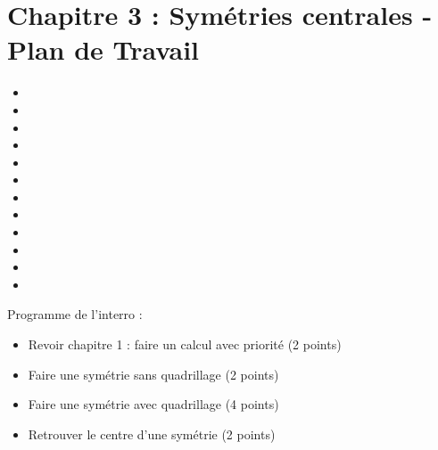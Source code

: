 \section*{Chapitre 3 : Symétries centrales - Plan de Travail}

{\begin{multicols}{4}
\begin{itemize}
    \itemindent=-25pt
        \item {}
        \item {}
        \item {}
        \item {}
        \item {}
        \item {}
        \item {}
        \item {}
        \item {}
        \item {}
        \item {}
        \item {}
    \end{itemize}
\end{multicols}}

\begin{plandetravailDS}
    Programme de l'interro :
    \begin{itemize}
        \item Revoir chapitre 1 : faire un calcul avec priorité (2 points) 
        \item Faire une symétrie sans quadrillage (2 points)
        \item Faire une symétrie avec quadrillage (4 points)
        \item Retrouver le centre d'une symétrie (2 points)
    \end{itemize}
\end{plandetravailDS}

